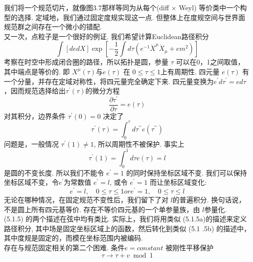 我们将一个规范切片，就像图3.7那样等同为从每个(diff $\times $ Weyl) 等价类中一个构型的选择. 定域地，我们通过固定度规实现这一点. 但整体上在度规空间与世界面规范群之间存在一个微小的错配.\\
又一次，点粒子是一个很好的例证. 我们希望计算Euclidean路径积分
\begin{equation}
\int[d e d X] \exp \left[-\frac{1}{2} \int d \tau\left(e^{-1} \dot{X}^{\mu} \dot{X}_{\mu}+e m^{2}\right)\right]
\end{equation}
考察在时空中形成闭合圈的路径，所以拓扑是圆，参量 $\tau$ 可以在0，1之间取值，其中端点是等价的. 即 $X^{\mu}(\tau)$与$e(\tau)$ 在 $0 \leq \tau \leq 1$上有周期性. 四元量 $e(\tau)$ 有一个分量，并存在定域对称性，将四元量完全确定下来. 四元量变换为$e^{\prime} d \tau^{\prime}=e d \tau $ ，因而规范选择给出$\tau^{\prime}(\tau)$的微分方程
\begin{equation}
\frac{\partial \tau^{\prime}}{\partial \tau}=e(\tau)
\end{equation}
对其积分，边界条件 $\tau^{\prime}(0)=0$ 决定了
\begin{equation}
	\tau^{\prime}(\tau)=\int_{0}^{\tau} d \tau^{\prime \prime} e\left(\tau^{\prime \prime}\right)
\end{equation}
问题是，一般情况 $\tau^{\prime}(1) \neq 1$, 所以周期性不被保护. 事实上
\begin{equation}
	\tau^{\prime}(1)=\int_{0}^{1} d \tau e(\tau)=l
\end{equation}
是圆的不变长度. 所以我们不能令 $e^{\prime}=1$ 的同时保持坐标区域不变. 我们可以保持坐标区域不变，令$e^{\prime}$为常数值 $e^{\prime}=l$, 或令 $e^{\prime}=1$ 而让坐标区域变化:
\begin{subequations}
\begin{equation}
e^{\prime}=l, \quad 0 \leq \tau \leq 1
\end{equation}
or
\begin{equation}
e^{\prime}=1, \quad 0 \leq \tau \leq l
\end{equation}
\end{subequations}
无论在哪种情况，在固定规范不变性后，我们留下了对 $l$的普遍积分. 换句话说，不是圆上所有四元基等价. 存在不等价四元基的一个单参量族，由 $l$参量化.\\
(5.1.5) 的两个描述在弦中均有类比. 实际上，我们将用类似 (5.1.5a)的描述来定义路径积分, 其中场是固定坐标区域上的函数，然后转化到类似 (5.1 .5b) 的描述中，其中度规是固定的，而模在坐标范围内被编码.\\
存在与规范固定相关的第二个困难. 条件$e=constant$ 被刚性平移保护
\begin{equation}
	\tau \rightarrow \tau+v \bmod 1
\end{equation}
